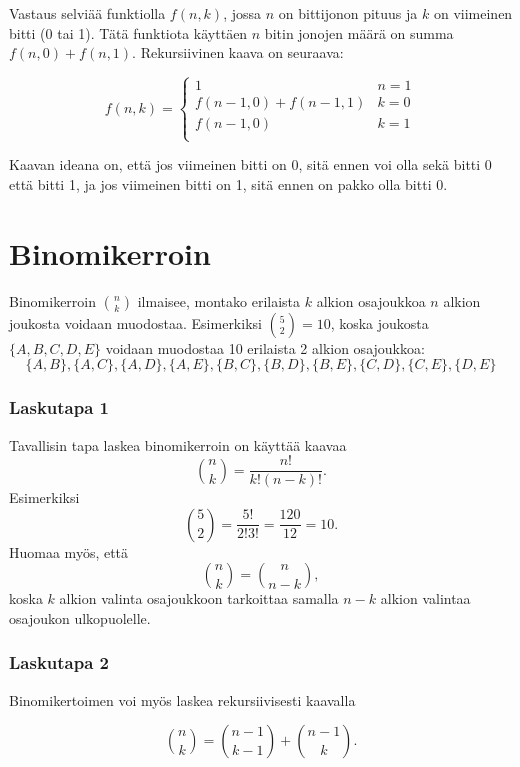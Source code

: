 Vastaus selviää funktiolla $f(n,k)$,
jossa $n$ on bittijonon pituus ja $k$ on viimeinen bitti (0 tai 1).
Tätä funktiota käyttäen $n$ bitin jonojen määrä
on summa $f(n,0)+f(n,1)$.
Rekursiivinen kaava on seuraava:

\begin{equation*}
    f(n,k) = \begin{cases}
               1               & n = 1\\
               f(n-1,0)+f(n-1,1) & k = 0\\
               f(n-1,0) & k = 1\\
           \end{cases}
\end{equation*}

Kaavan ideana on, että jos viimeinen bitti on 0,
sitä ennen voi olla sekä bitti 0 että bitti 1,
ja jos viimeinen bitti on 1, sitä ennen on
pakko olla bitti 0.


\section{Binomikerroin}

Binomikerroin ${n \choose k}$ ilmaisee, montako
erilaista $k$ alkion osajoukkoa $n$ alkion joukosta
voidaan muodostaa.
Esimerkiksi ${5 \choose 2}=10$,
koska joukosta $\{A,B,C,D,E\}$
voidaan muodostaa 10 erilaista 2 alkion osajoukkoa:
\[ \{A,B\}, \{A,C\}, \{A,D\}, \{A,E\}, \{B,C\}, 
\{B,D\}, \{B,E\}, \{C,D\}, \{C,E\}, \{D,E\} \]

\subsubsection*{Laskutapa 1}

Tavallisin tapa laskea binomikerroin on
käyttää kaavaa
\[ {n \choose k}  = \frac{n!}{k!(n-k)!} .\]
Esimerkiksi
\[ {5 \choose 2} = \frac{5!}{2!3!} = \frac{120}{12} = 10. \]
Huomaa myös, että
\[ {n \choose k} = {n \choose n-k},\]
koska $k$ alkion valinta osajoukkoon tarkoittaa
samalla $n-k$ alkion valintaa osajoukon ulkopuolelle.

\subsubsection*{Laskutapa 2}

Binomikertoimen voi myös laskea rekursiivisesti kaavalla

\[  {n \choose k} = {n-1 \choose k-1} + {n-1 \choose k}.  \]

